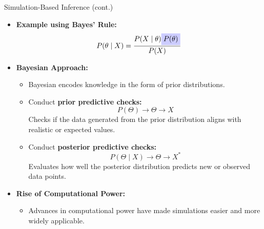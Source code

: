 \documentclass{beamer}
\begin{document}
\begin{frame}{Simulation-Based Inference (cont.)}
\begin{itemize}
    \item \textbf{Example using Bayes' Rule:}
    \[
    P(\theta \mid X) = \frac{P(X \mid \theta) \colorbox{blue!20}{$P(\theta)$}}{P(X)}
    \]

    \item \textbf{Bayesian Approach:}
    \begin{itemize}
        \item Bayesian encodes knowledge in the form of prior distributions.
        \item Conduct \textbf{prior predictive checks:}
        \[
        P(\Theta) \to \Theta \to X
        \]
        Checks if the data generated from the prior distribution aligns with realistic or expected values.
        \item Conduct \textbf{posterior predictive checks:}
        \[
        P(\Theta \mid X) \to \Theta \to X^*
        \]
        Evaluates how well the posterior distribution predicts new or observed data points.
    \end{itemize}

    \item \textbf{Rise of Computational Power:}
    \begin{itemize}
        \item Advances in computational power have made simulations easier and more widely applicable.
    \end{itemize}
\end{itemize}
\end{frame}
\end{document}
